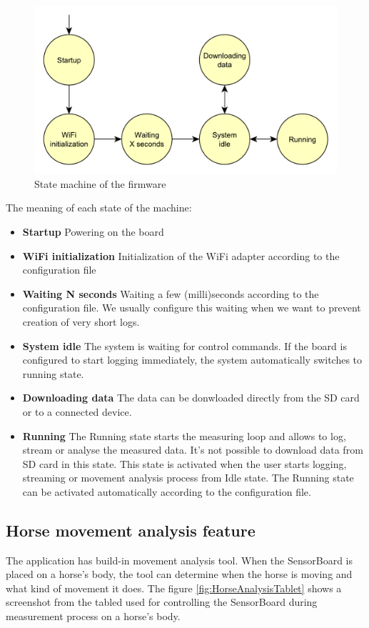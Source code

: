 \begin{figure}
	\centering
	\label{firmwareStateMachine}
	\caption{State machine of the firmware}
	\includegraphics[width=16cm]{img/firmwareStateMachine.pdf}
\end{figure}

The meaning of each state of the machine:
\begin{itemize}
	\item \textbf{Startup} Powering on the board
	\item \textbf{WiFi initialization} Initialization of the WiFi adapter according to the configuration file
	\item \textbf{Waiting N seconds} Waiting a few (milli)seconds according to the configuration file. We usually configure this waiting when we want to prevent creation of very short logs.
	\item \textbf{System idle} The system is waiting for control commands. If the board is configured to start logging immediately, the system automatically switches to running state.
	\item \textbf{Downloading data} The data can be donwloaded directly from the SD card or to a connected device.
	\item \textbf{Running} The Running state starts the measuring loop and allows to log, stream or analyse the measured data. It's not possible to download data from SD card in this state. This state is activated when the user starts logging, streaming or movement analysis process from Idle state. The Running state can be activated automatically according to the configuration file.
\end{itemize}

\subsection{Horse movement analysis feature}
The application has build-in movement analysis tool. When the SensorBoard is placed on a horse's body, the tool can determine when the horse is moving and what kind of movement it does. The figure \ref{fig:HorseAnalysisTablet} shows a screenshot from the tabled used for controlling the SensorBoard during measurement process on a horse's body.

